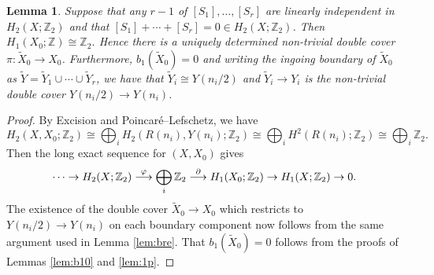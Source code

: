 \documentclass{amsart}
\newtheorem{lemma}[theorem]{Lemma}
\theoremstyle{definition}
\theoremstyle{remark}
\numberwithin{equation}{section}
\begin{document}
\begin{lemma}\label{lem:rpcov}
Suppose that any $r-1$ of $[S_1] , \dots , [S_r]$ are linearly independent in $H_2(X ; \mathbb{Z}_2)$ and that $[S_1] + \cdots + [S_r] = 0 \in H_2(X ; \mathbb{Z}_2)$. Then $H_1(X_0 ; \mathbb{Z}) \cong \mathbb{Z}_2$. Hence there is a uniquely determined non-trivial double cover $\pi : \widetilde{X}_0 \to X_0$. Furthermore, $b_1(\widetilde{X}_0) = 0$ and writing the ingoing boundary of $\widetilde{X}_0$ as $\widetilde{Y} = \widetilde{Y}_1 \cup \cdots \cup \widetilde{Y}_r$, we have that $\widetilde{Y}_i \cong Y(n_i/2)$ and $\widetilde{Y}_i \to Y_i$ is the non-trivial double cover $Y(n_i/2) \to Y(n_i)$.
\end{lemma}
\begin{proof}
By Excision and Poincar\'e--Lefschetz, we have
\[
H_2(X,X_0 ; \mathbb{Z}_2) \cong \bigoplus_i H_2(R(n_i), Y(n_i) ; \mathbb{Z}_2) \cong \bigoplus_i H^2(R(n_i) ; \mathbb{Z}_2) \cong \bigoplus_i \mathbb{Z}_2.
\]
Then the long exact sequence for $(X , X_0)$ gives
\[
\cdots \to H_2(X ; \mathbb{Z}_2) \buildrel \varphi \over \longrightarrow \bigoplus_i \mathbb{Z}_2 \buildrel \partial \over \longrightarrow H_1(X_0 ; \mathbb{Z}_2) \to H_1(X ; \mathbb{Z}_2) \to 0.
\]
The existence of the double cover $\widetilde{X}_0 \to X_0$ which restricts to $Y(n_i/2) \to Y(n_i)$ on each boundary component now follows from the same argument used in Lemma \ref{lem:bre}. That $b_1(\widetilde{X}_0) = 0$ follows from the proofs of Lemmas \ref{lem:b10} and \ref{lem:1p}.
\end{proof}
\end{document}

